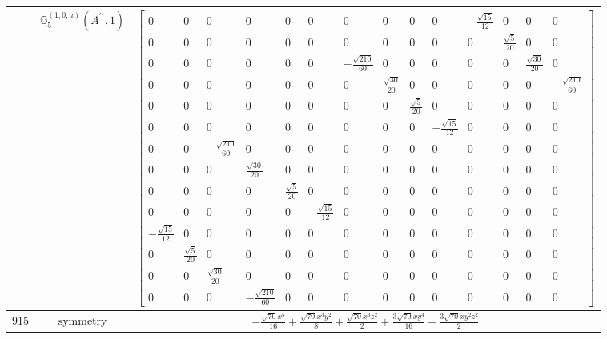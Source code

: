 \documentclass[fleqn,8pt,landscape]{jsarticle}
\begin{document}
\begin{longtable}{ccc}
$  $ & $ \mathbb{G}_{5}^{(1,0;a)}(A^{\prime\prime},1) $ & $ \begin{bmatrix} 0 & 0 & 0 & 0 & 0 & 0 & 0 & 0 & 0 & 0 & - \frac{\sqrt{15}}{12} & 0 & 0 & 0 \\ 0 & 0 & 0 & 0 & 0 & 0 & 0 & 0 & 0 & 0 & 0 & \frac{\sqrt{5}}{20} & 0 & 0 \\ 0 & 0 & 0 & 0 & 0 & 0 & - \frac{\sqrt{210}}{60} & 0 & 0 & 0 & 0 & 0 & \frac{\sqrt{30}}{20} & 0 \\ 0 & 0 & 0 & 0 & 0 & 0 & 0 & \frac{\sqrt{30}}{20} & 0 & 0 & 0 & 0 & 0 & - \frac{\sqrt{210}}{60} \\ 0 & 0 & 0 & 0 & 0 & 0 & 0 & 0 & \frac{\sqrt{5}}{20} & 0 & 0 & 0 & 0 & 0 \\ 0 & 0 & 0 & 0 & 0 & 0 & 0 & 0 & 0 & - \frac{\sqrt{15}}{12} & 0 & 0 & 0 & 0 \\ 0 & 0 & - \frac{\sqrt{210}}{60} & 0 & 0 & 0 & 0 & 0 & 0 & 0 & 0 & 0 & 0 & 0 \\ 0 & 0 & 0 & \frac{\sqrt{30}}{20} & 0 & 0 & 0 & 0 & 0 & 0 & 0 & 0 & 0 & 0 \\ 0 & 0 & 0 & 0 & \frac{\sqrt{5}}{20} & 0 & 0 & 0 & 0 & 0 & 0 & 0 & 0 & 0 \\ 0 & 0 & 0 & 0 & 0 & - \frac{\sqrt{15}}{12} & 0 & 0 & 0 & 0 & 0 & 0 & 0 & 0 \\ - \frac{\sqrt{15}}{12} & 0 & 0 & 0 & 0 & 0 & 0 & 0 & 0 & 0 & 0 & 0 & 0 & 0 \\ 0 & \frac{\sqrt{5}}{20} & 0 & 0 & 0 & 0 & 0 & 0 & 0 & 0 & 0 & 0 & 0 & 0 \\ 0 & 0 & \frac{\sqrt{30}}{20} & 0 & 0 & 0 & 0 & 0 & 0 & 0 & 0 & 0 & 0 & 0 \\ 0 & 0 & 0 & - \frac{\sqrt{210}}{60} & 0 & 0 & 0 & 0 & 0 & 0 & 0 & 0 & 0 & 0 \end{bmatrix} $ \\ \hline
$ 915 $ & $ \text{symmetry} $ & $ - \frac{\sqrt{70} x^{5}}{16} + \frac{\sqrt{70} x^{3} y^{2}}{8} + \frac{\sqrt{70} x^{3} z^{2}}{2} + \frac{3 \sqrt{70} x y^{4}}{16} - \frac{3 \sqrt{70} x y^{2} z^{2}}{2} $ \\

\end{longtable}
\end{document}
